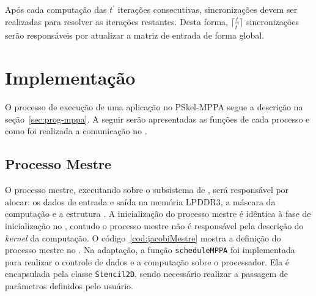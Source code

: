 

%

Após cada computação das $t^\prime$ iterações consecutivas,
sincronizações devem ser realizadas para resolver as iterações restantes. Desta
forma, $\lceil\frac{t}{t^\prime}\rceil$ sincronizações serão responsáveis por
atualizar a matriz de entrada de forma global.


\section{Implementação}
O processo de execução de uma aplicação no PSkel-MPPA segue a descrição na
seção~\ref{sec:prog-mppa}. A seguir serão apresentadas as funções de cada
processo e como foi realizada a comunicação no \mppa.

\subsection{Processo Mestre}
O processo mestre, executando sobre o subsistema de \es, será responsável por
alocar: os dados de entrada e saída na memória LPDDR3, a máscara da computação e
a estrutura \stencil. A inicialização do processo mestre é idêntica à fase de inicialização no
\pskel, contudo o processo mestre não é responsável pela descrição do
\textit{kernel} da computação. O código~\ref{cod:jacobiMestre} mostra a
definição do processo mestre no \mppa.  Na adaptação, a função
\texttt{scheduleMPPA} foi implementada para realizar o controle de dados e a
computação sobre o processador. Ela é encapsulada pela classe
\texttt{Stencil2D}, sendo necessário realizar a passagem de parâmetros definidos
pelo usuário.

